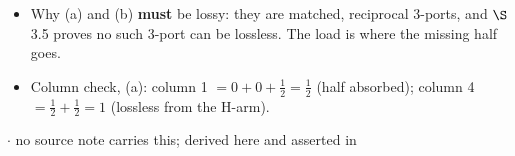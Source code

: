\vspace{2pt}
\begin{itemize}
  \item Why (a) and (b) \textbf{must} be lossy: they are matched, reciprocal 3-ports, and
    $\S$3.5 proves no such 3-port can be lossless. The load is where the missing half goes.
  \item Column check, (a): column 1 $= 0 + 0 + \tfrac12 = \tfrac12$ (half absorbed);
    column 4 $= \tfrac12 + \tfrac12 = 1$ (lossless from the H-arm).
\end{itemize}

\vspace{2pt}

{\color{sub}\footnotesize {} \gap$\cdot$\gap \added{} no source note carries this; derived here and asserted in }

